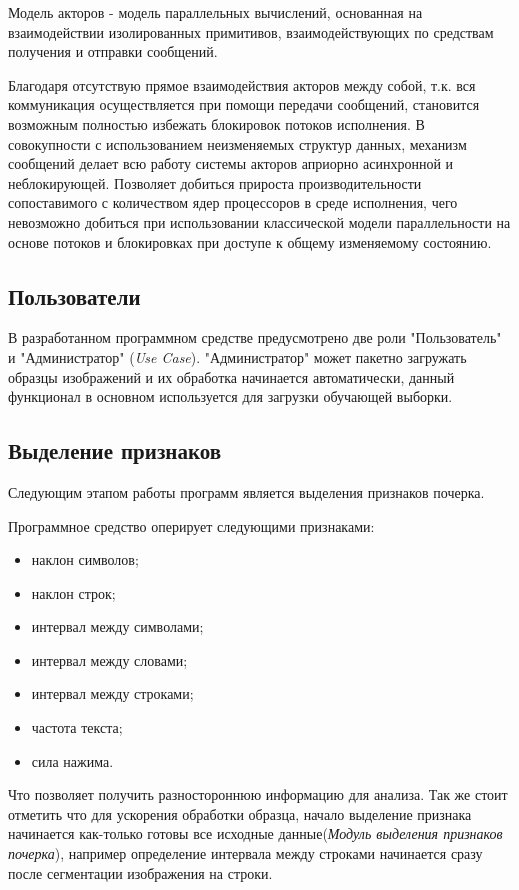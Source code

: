 Модель акторов - модель параллельных вычислений, основанная на взаимодействии изолированных примитивов, взаимодействующих по средствам получения и отправки сообщений. 

Благодаря отсутствую прямое взаимодействия акторов между собой, т.к. вся коммуникация осуществляется при помощи передачи сообщений, становится возможным полностью избежать блокировок потоков исполнения. В совокупности с использованием неизменяемых структур данных, механизм сообщений делает всю работу системы акторов априорно асинхронной и неблокирующей. Позволяет добиться прироста производительности сопоставимого с количеством ядер процессоров в среде исполнения, чего невозможно добиться при использовании классической модели параллельности на основе потоков и блокировках при доступе к общему изменяемому состоянию.

\subsection{Пользователи}

В разработанном программном средстве предусмотрено две роли "Пользователь" и "Администратор" (\emph{Use Case}).
"Администратор" может пакетно загружать образцы изображений и их обработка начинается автоматически, данный функционал в основном используется для загрузки обучающей выборки.

\subsection{Выделение признаков}

Следующим этапом работы программ является выделения признаков почерка.

Программное средство оперирует следующими признаками:
\begin{itemize}
  \item наклон символов;
  \item наклон строк;
  \item интервал между символами;
  \item интервал между словами;
  \item интервал между строками;
  \item частота текста;
  \item сила нажима.
\end{itemize}

Что позволяет получить разностороннюю информацию для анализа.
Так же стоит отметить что для ускорения обработки образца, начало выделение признака начинается как-только готовы все исходные данные(\emph{Модуль выделения признаков почерка}), например определение интервала между строками начинается сразу после сегментации изображения на строки.


